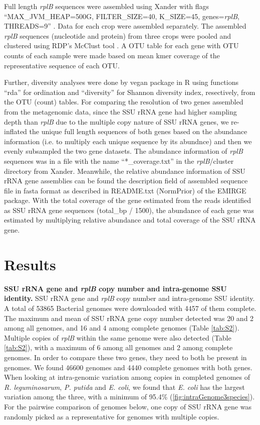 \documentclass[]{msu-thesis}
\begin{document}
Full length \textit{rplB} sequences were assembled using Xander with flags ``MAX\_JVM\_HEAP=500G, FILTER\_SIZE=40, K\_SIZE=45, genes=\textit{rplB}, THREADS=9'' \cite{wang_xander:_2015}. Data for each crop were assembled separately. The assembled \textit{rplB} sequences (nucleotide and protein) from three crops were pooled and clustered using RDP’s McClust tool \cite{cole_ribosomal_2014}. A OTU table for each gene with OTU counts of each sample were made based on mean kmer coverage of the representative sequence of each OTU. 

Further, diversity analyses were done by vegan package in R using functions ``rda'' for ordination and ``diversity'' for Shannon diversity index, resectively, from the OTU (count) tables. For comparing the resolution of two genes assembled from the metagenomic data, since the SSU rRNA gene had higher sampling depth than \textit{rplB} due to the multiple copy nature of SSU rRNA genes, we re-inflated the unique full length sequences of both genes based on the abundance information (i.e. to multiply each unique sequence by its abundnce) and then we evenly subsampled the two gene datasets. The abundance information of \textit{rplB} sequences was in a file with the name ``*\_coverage.txt'' in the \textit{rplB}/cluster directory from Xander. Meanwhile, the relative abundance information of SSU rRNA gene assemblies can be found the description field of assembled sequence file in fasta format as described in README.txt (NormPrior) of the EMIRGE package. With the total coverage of the gene estimated from the reads identified as  SSU rRNA gene sequences (total\_bp / 1500), the abundance of each gene was estimated by multiplying relative abundance and total coverage of the SSU rRNA gene.

\section{Results}

\textbf{SSU rRNA gene and \textit{rplB} copy number and intra-genome SSU identity. }
SSU rRNA gene and \textit{rplB} copy number and intra-genome SSU identity. A total of 53865 Bacterial genomes were downloaded with 4457 of them complete. The maximum and mean of SSU rRNA gene copy number detected was 20 and 2 among all genomes, and 16 and 4 among complete genomes (Table \ref{tab:S2}). Multiple copies of \textit{rplB} within the same genome were also detected (Table \ref{tab:S2}), with a maximum of 6 among all genomes and 2 among complete genomes. In order to compare these two genes, they need to both be present in genomes. We found 46600 genomes and 4440 complete genomes with both genes. When looking at intra-genomic variation among copies in completed genomes of \textit{R. leguminosarum}, \textit{P. putida} and \textit{E. coli}, we found that \textit{E. coli} has the largest variation among the three, with a minimum of 95.4\% (\cref{fig:intraGenome3species}). For the pairwise comparison of genomes below, one copy of SSU rRNA gene was randomly picked as a representative for genomes with multiple copies.
\end{document}
